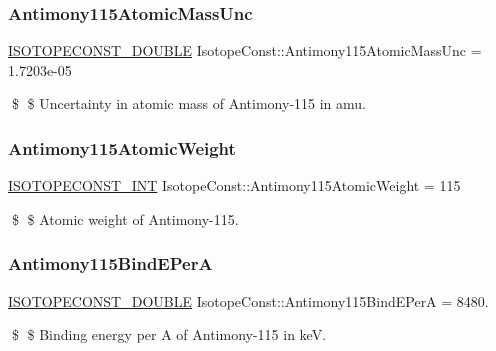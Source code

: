 \subsubsection{\texorpdfstring{Antimony115\+Atomic\+Mass\+Unc}{Antimony115AtomicMassUnc}}
{\footnotesize\ttfamily \mbox{\hyperlink{group___isotope_const-_macros_ga8f45a7272ce02c0b4c65c44636ed719a}{I\+S\+O\+T\+O\+P\+E\+C\+O\+N\+S\+T\+\_\+\+D\+O\+U\+B\+LE}} Isotope\+Const\+::\+Antimony115\+Atomic\+Mass\+Unc = 1.\+7203e-\/05}

\$ \$ Uncertainty in atomic mass of Antimony-\/115 in amu. \mbox{\label{group___isotope_const-_antimony-_sb115_ga8e1ef0e91c2b511449362bb3eda4bdbb}} 
\subsubsection{\texorpdfstring{Antimony115\+Atomic\+Weight}{Antimony115AtomicWeight}}
{\footnotesize\ttfamily \mbox{\hyperlink{group___isotope_const-_macros_ga5f18360b3e99483a35c32d789e62621c}{I\+S\+O\+T\+O\+P\+E\+C\+O\+N\+S\+T\+\_\+\+I\+NT}} Isotope\+Const\+::\+Antimony115\+Atomic\+Weight = 115}

\$ \$ Atomic weight of Antimony-\/115. \mbox{\label{group___isotope_const-_antimony-_sb115_ga0f7adec947afa76d1ef101bbf4736b58}} 
\subsubsection{\texorpdfstring{Antimony115\+Bind\+E\+PerA}{Antimony115BindEPerA}}
{\footnotesize\ttfamily \mbox{\hyperlink{group___isotope_const-_macros_ga8f45a7272ce02c0b4c65c44636ed719a}{I\+S\+O\+T\+O\+P\+E\+C\+O\+N\+S\+T\+\_\+\+D\+O\+U\+B\+LE}} Isotope\+Const\+::\+Antimony115\+Bind\+E\+PerA = 8480.}

\$ \$ Binding energy per A of Antimony-\/115 in keV. \mbox{\label{group___isotope_const-_antimony-_sb115_gac37ba3a0ed2941f88ee9b0a1529f3d77}} 
